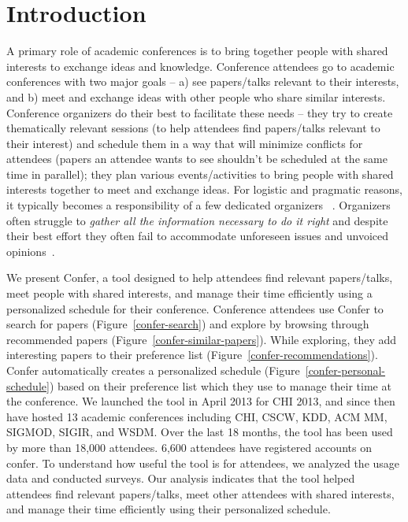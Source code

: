 \documentclass{sigchi}
\begin{document}


\section{Introduction}
A primary role of academic conferences is to bring together people with shared interests to exchange ideas and knowledge. Conference attendees go to academic conferences with two major goals -- a) see papers/talks relevant to their interests, and b) meet and exchange ideas with other people who share similar interests. Conference organizers do their best to facilitate these needs -- they try to create thematically relevant sessions (to help attendees find papers/talks relevant to their interest) and schedule them in a way that will minimize conflicts for attendees (papers an attendee wants to see shouldn't be scheduled at the same time in parallel); they plan various events/activities to bring people with shared interests together to meet and exchange ideas.  For logistic and pragmatic reasons, it typically becomes a responsibility of a few dedicated organizers ~\cite{EventPlanning}. Organizers often struggle to \emph{gather all the information necessary to do it right} and despite their best effort they often fail to accommodate unforeseen issues and unvoiced opinions~\cite{CoDesign}.

We present Confer, a tool designed to help attendees find relevant papers/talks, meet people with shared interests, and manage their time efficiently using a personalized schedule for their conference. Conference attendees use Confer to search for papers (Figure~\ref{confer-search}) and explore by browsing through recommended papers (Figure~\ref{confer-similar-papers}). While exploring, they add interesting papers to their preference list (Figure~\ref{confer-recommendations}). Confer automatically creates a personalized schedule (Figure~\ref{confer-personal-schedule}) based on their preference list which they use to manage their time at the conference. We launched the tool in April 2013 for CHI 2013, and since then have hosted 13 academic conferences including CHI, CSCW, KDD, ACM MM, SIGMOD, SIGIR, and WSDM. Over the last 18 months, the tool has been used by more than 18,000 attendees. 6,600 attendees have registered accounts on confer. To understand how useful the tool is for attendees, we analyzed the usage data and conducted surveys. Our analysis indicates that the tool helped attendees find relevant papers/talks, meet other attendees with shared interests, and manage their time efficiently using their personalized schedule.
\end{document}
